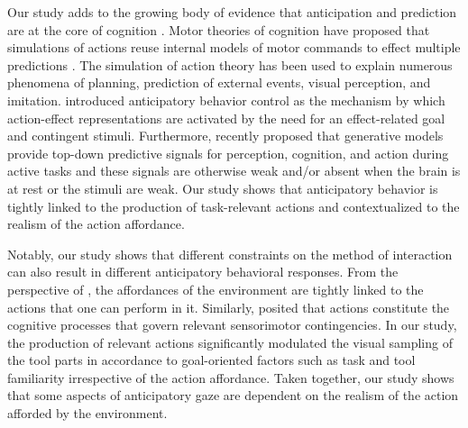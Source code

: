 Our study adds to the growing body of evidence that anticipation and prediction are at the core of cognition \citep{Pezzulo2007-ot}. Motor theories of cognition have proposed that simulations of actions reuse  internal models of motor commands to effect multiple predictions \citep{Jeannerod2006-dt}. The simulation of action theory has been used to explain numerous phenomena of planning, prediction of external events, visual perception, and imitation. \citet{Hoffmann2003-ur} introduced anticipatory behavior control as the mechanism by which action-effect representations are activated by the need for an effect-related goal and contingent stimuli. Furthermore, \citet{Pezzulo2021-te} recently proposed that generative models provide top-down predictive signals for perception, cognition, and action during active tasks and these signals are otherwise weak and/or absent when the brain is at rest or the stimuli are weak. Our study shows that anticipatory behavior is tightly linked to the production of task-relevant actions and contextualized to the realism of the action affordance.

Notably, our study shows that different constraints on the method of interaction can also result in different anticipatory behavioral responses. From the perspective of \citet{Gibson1977-zj}, the affordances of the environment are tightly linked to the actions that one can perform in it. Similarly, \citet{ORegan2001-pd} posited that actions constitute the cognitive processes that govern relevant sensorimotor contingencies. In our study, the production of relevant actions significantly modulated the visual sampling of the tool parts in accordance to goal-oriented factors such as task and tool familiarity irrespective of the action affordance. Taken together, our study shows that some aspects of anticipatory gaze are dependent on the realism of the action afforded by the environment.

